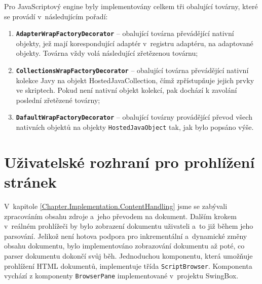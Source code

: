 Pro JavaScriptový engine byly implementovány celkem tři obalující továrny, které se provádí v~následujícím pořadí:

\begin{enumerate}
  \item \textbf{\texttt{AdapterWrapFactoryDecorator}} -- obalující továrna převádějící nativní objekty, jež mají korespondující adaptér v~registru adaptéru, na adaptované objekty. Továrna vždy volá následující zřetězenou továrnu;
  \item \textbf{\texttt{CollectionsWrapFactoryDecorator}} -- obalující továrna převádějící nativní kolekce Javy na objekt HostedJavaCollection, čímž zpřístupňuje jejich prvky ve skriptech. Pokud není nativní objekt kolekcí, pak dochází k zavolání poslední zřetězené továrny;
  \item \textbf{\texttt{DafaultWrapFactoryDecorator}} -- obalující továrny provádějící převod všech nativních objektů na objekty \texttt{HostedJavaObject} tak, jak bylo popsáno výše.
\end{enumerate}

\section{Uživatelské rozhraní pro prohlížení stránek}
\label{Chapter.Implementation.UserInterface}

V~kapitole \ref{Chapter.Implementation.ContentHandling} jsme se zabývali zpracováním obsahu zdroje a~jeho převodem na dokument. Dalším krokem v~reálném prohlížeči by bylo zobrazení dokumentu uživateli a~to již během jeho parsování. Jelikož není hotova podpora pro inkrementální a~dynamické změny obsahu dokumentu, bylo implementováno zobrazování dokumentu až poté, co parser dokumentu dokončí svůj běh. Jednoduchou komponentu, která umožňuje prohlížení HTML dokumentů, implementuje třída \texttt{ScriptBrowser}. Komponenta vychází z komponenty \texttt{BrowserPane} implementované v~projektu SwingBox.

